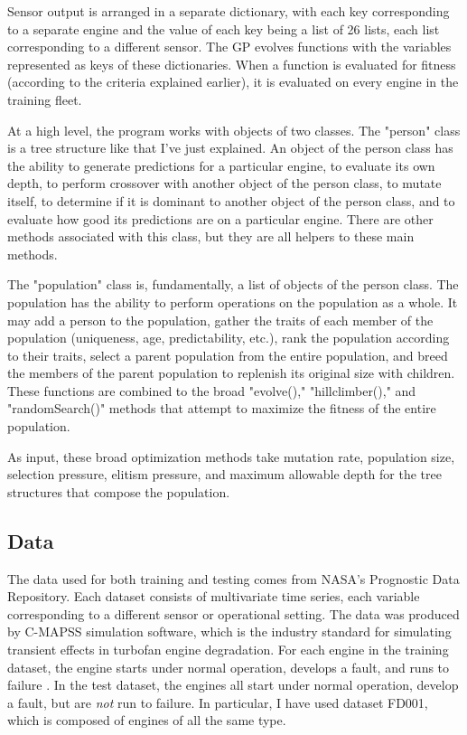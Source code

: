 \documentclass{acm_proc_article-sp}
\begin{document}
Sensor output is arranged in a separate dictionary, with each key corresponding to a separate engine and the value of each key being a list of 26 lists, each list corresponding to a different sensor. The GP evolves functions with the variables represented as keys of these dictionaries. When a function is evaluated for fitness (according to the criteria explained earlier), it is evaluated on every engine in the training fleet.

At a high level, the program works with objects of two classes. The "person" class is a tree structure like that I've just explained. An object of the person class has the ability to generate predictions for a particular engine, to evaluate its own depth, to perform crossover with another object of the person class, to mutate itself, to determine if it is dominant to another object of the person class, and to evaluate how good its predictions are on a particular engine. There are other methods associated with this class, but they are all helpers to these main methods.

The "population" class is, fundamentally, a list of objects of the person class. The population has the ability to perform operations on the population as a whole. It may add a person to the population, gather the traits of each member of the population (uniqueness, age, predictability, etc.), rank the population according to their traits, select a parent population from the entire population, and breed the members of the parent population to replenish its original size with children. These functions are combined to the broad "evolve()," "hillclimber()," and "randomSearch()" methods that attempt to maximize the fitness of the entire population.

As input, these broad optimization methods take mutation rate, population size, selection pressure, elitism pressure, and maximum allowable depth for the tree structures that compose the population.

\subsection{Data}
The data used for both training and testing comes from NASA's Prognostic Data Repository. Each dataset consists of 	multivariate time series, each variable corresponding to a different sensor or operational setting. The data was produced by C-MAPSS simulation software, which is the industry standard for simulating transient effects in turbofan engine degradation. For each engine in the training dataset, the engine starts under normal operation, develops a fault, and runs to failure \cite{nasa} \cite{Mog}. In the test dataset, the engines all start under normal operation, develop a fault, but are {\it{not}} run to failure. In particular, I have used dataset FD001, which is composed of engines of all the same type.
\end{document}
